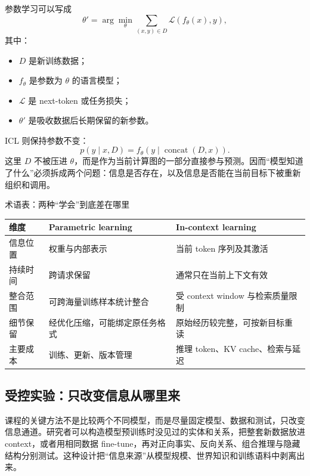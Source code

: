 
参数学习可以写成
$$
\theta' = \arg\min_{\theta}\sum_{(x,y)\in D}\mathcal{L}\!\left(f_{\theta}(x),y\right),
$$
其中：
\begin{itemize}
  \item $D$ 是新训练数据；
  \item $f_{\theta}$ 是参数为 $\theta$ 的语言模型；
  \item $\mathcal{L}$ 是 next-token 或任务损失；
  \item $\theta'$ 是吸收数据后长期保留的新参数。
\end{itemize}

ICL 则保持参数不变：
$$
p(y\mid x,D)=f_{\theta}\!\left(y\mid \operatorname{concat}(D,x)\right).
$$
这里 $D$ 不被压进 $\theta$，而是作为当前计算图的一部分直接参与预测。因而“模型知道了什么”必须拆成两个问题：信息是否存在，以及信息是否能在当前目标下被重新组织和调用。

\begin{knowledgebox}{术语表：两种“学会”到底差在哪里}
\begin{tabularx}{\textwidth}{L{0.22\textwidth}X X}
\toprule
维度 & Parametric learning & In-context learning \\
\midrule
信息位置 & 权重与内部表示 & 当前 token 序列及其激活 \\
持续时间 & 跨请求保留 & 通常只在当前上下文有效 \\
整合范围 & 可跨海量训练样本统计整合 & 受 context window 与检索质量限制 \\
细节保留 & 经优化压缩，可能绑定原任务格式 & 原始经历较完整，可按新目标重读 \\
主要成本 & 训练、更新、版本管理 & 推理 token、KV cache、检索与延迟 \\
\bottomrule
\end{tabularx}
\end{knowledgebox}

\subsection{受控实验：只改变信息从哪里来}

课程的关键方法不是比较两个不同模型，而是尽量固定模型、数据和测试，只改变信息通道。研究者可以构造模型预训练时没见过的实体和关系，把整套新数据放进 context，或者用相同数据 fine-tune，再对正向事实、反向关系、组合推理与隐藏结构分别测试。这种设计把“信息来源”从模型规模、世界知识和训练语料中剥离出来。

